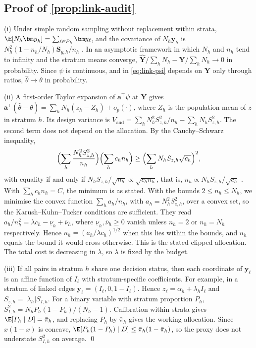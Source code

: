 \subsection{Proof of \texorpdfstring{\cref{prop:link-audit}}{the audit proposition}}\label{app:link-audit}

(i) Under simple random sampling without replacement within strata, $\E[N_h\bar{\bm y}_h]=\sum_{\ell\in\mathcal P_h}\bm y_\ell$, and the covariance of $N_h\bar{\bm y}_h$ is $N_h^2(1-n_h/N_h)\bm S_{y,h}/n_h$ \citep[Ch.~5]{cochran1977}. In an asymptotic framework in which $N_h$ and $n_h$ tend to infinity and the stratum means converge, $\hat{\bm Y}/\sum_hN_h-\bm Y/\sum_hN_h\to0$ in probability. Since $\psi$ is continuous, and in \eqref{eq:link-psi} depends on $\bm Y$ only through ratios, $\hat\theta\to\theta$ in probability.

(ii) A first-order Taylor expansion of $\bm a^{\top}\psi$ at $\bm Y$ gives $\bm a^{\top}(\hat\theta-\theta)=\sum_hN_h(\bar z_h-\bar Z_h)+o_p(\cdot)$, where $\bar Z_h$ is the population mean of $z$ in stratum $h$. Its design variance is $V_{\mathrm{aud}}=\sum_hN_h^2S_{z,h}^2/n_h-\sum_hN_hS_{z,h}^2$. The second term does not depend on the allocation. By the Cauchy--Schwarz inequality,
\[
  \Bigl(\sum_h\frac{N_h^2S_{z,h}^2}{n_h}\Bigr)\Bigl(\sum_hc_hn_h\Bigr)\ge\Bigl(\sum_hN_hS_{z,h}\sqrt{c_h}\Bigr)^2,
\]
with equality if and only if $N_hS_{z,h}/\sqrt{n_h}\propto\sqrt{c_hn_h}$, that is, $n_h\propto N_hS_{z,h}/\sqrt{c_h}$ \citep{neyman1934}. With $\sum_hc_hn_h=C$, the minimum is as stated. With the bounds $2\le n_h\le N_h$, we minimise the convex function $\sum_ha_h/n_h$, with $a_h=N_h^2S_{z,h}^2$, over a convex set, so the Karush--Kuhn--Tucker conditions are sufficient. They read $a_h/n_h^2=\lambda c_h-\underline\nu_h+\bar\nu_h$, where $\underline\nu_h,\bar\nu_h\ge0$ vanish unless $n_h=2$ or $n_h=N_h$ respectively. Hence $n_h=(a_h/\lambda c_h)^{1/2}$ when this lies within the bounds, and $n_h$ equals the bound it would cross otherwise. This is the stated clipped allocation. The total cost is decreasing in $\lambda$, so $\lambda$ is fixed by the budget.

(iii) If all pairs in stratum $h$ share one decision status, then each coordinate of $\bm y_\ell$ is an affine function of $I_\ell$ with stratum-specific coefficients. For example, in a stratum of linked edges $\bm y_\ell=(I_\ell,0,1-I_\ell)$. Hence $z_\ell=\alpha_h+\lambda_hI_\ell$ and $S_{z,h}=|\lambda_h|S_{I,h}$. For a binary variable with stratum proportion $P_h$, $S_{I,h}^2=N_hP_h(1-P_h)/(N_h-1)$. Calibration within strata gives $\E[P_h\mid D]=\bar\pi_h$, and replacing $P_h$ by $\bar\pi_h$ gives the working allocation. Since $x(1-x)$ is concave, $\E[P_h(1-P_h)\mid D]\le\bar\pi_h(1-\bar\pi_h)$, so the proxy does not understate $S_{I,h}^2$ on average. \qed
